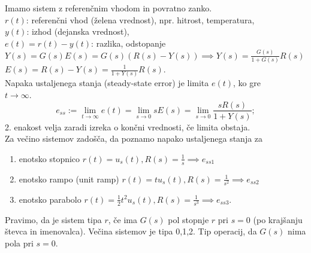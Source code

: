 \documentclass[a4paper, 12pt]{book}
\theoremstyle{definition}
\theoremstyle{remark}
\begin{document}
Imamo sistem z referenčnim vhodom in povratno zanko. \\
$r(t)$: referenčni vhod (želena vrednost), npr. hitrost, temperatura, \\
$y(t)$: izhod (dejanska vrednost), \\
$e(t) = r(t) - y(t)$: razlika, odstopanje \\
$Y(s) = G(s) E(s) = G(s) (R(s) - Y(s)) \implies Y(s) = \frac{G(s)}{1+G(s)} R(s)$ \\
$E(s) = R(s) - Y(s) = \frac{1}{1+Y(s)} R(s)$. \\
Napaka ustaljenega stanja (steady-state error) je limita $e(t)$, ko gre \\
$t \to \infty$.
\begin{equation*}
    e_{ss} := \lim_{t \to \infty} e(t) = \lim_{s \to 0} s E(s) =
    \lim_{s \to 0} \frac{s R(s)}{1+Y(s)};
\end{equation*}
2. enakost velja zaradi izreka o končni vrednosti, če limita obstaja. \\
Za večino sistemov zadošča, da poznamo napako ustaljenega stanja za
\begin{enumerate}[label=\alph*)]
    \item enotsko stopnico $r(t) = u_s(t), R(s) = \frac{1}{s} \implies e_{ss1}$
    \item enotsko rampo (unit ramp) $r(t) = t u_s(t), R(s) = \frac{1}{s^2} \implies e_{ss2}$
    \item enotsko parabolo $r(t) = \frac{1}{2} t^2 u_s(t), R(s) = \frac{1}{s^3} \implies e_{ss3}$.
\end{enumerate}
Pravimo, da je sistem tipa $r$, če ima $G(s)$ pol stopnje $r$ pri $s=0$
(po krajšanju števca in imenovalca).
Večina sistemov je tipa 0,1,2.
Tip operacij, da $G(s)$ nima pola pri $s = 0$.
\end{document}
